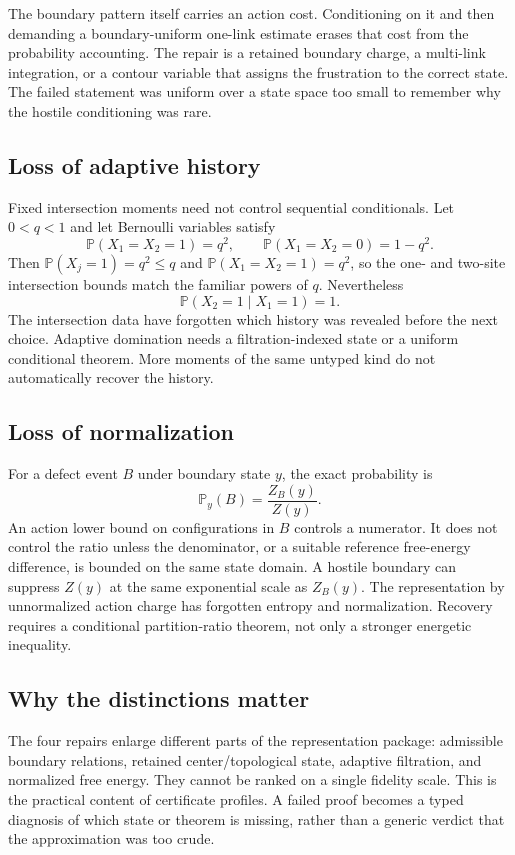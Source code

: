 The boundary pattern itself carries an action cost.  Conditioning on it and
then demanding a boundary-uniform one-link estimate erases that cost from the
probability accounting.  The repair is a retained boundary charge, a
multi-link integration, or a contour variable that assigns the frustration
to the correct state.  The failed statement was uniform over a state space
too small to remember why the hostile conditioning was rare.

\subsection{Loss of adaptive history}

Fixed intersection moments need not control sequential conditionals.  Let
$0<q<1$ and let Bernoulli variables satisfy
\[
 \mathbb P(X_1=X_2=1)=q^2,
 \qquad
 \mathbb P(X_1=X_2=0)=1-q^2.
\]
Then $\mathbb P(X_j=1)=q^2\leq q$ and
$\mathbb P(X_1=X_2=1)=q^2$, so the one- and two-site intersection bounds
match the familiar powers of $q$.  Nevertheless
\[
 \mathbb P(X_2=1\mid X_1=1)=1.
\]
The intersection data have forgotten which history was revealed before the
next choice.  Adaptive domination needs a filtration-indexed state or a
uniform conditional theorem.  More moments of the same untyped kind do not
automatically recover the history.

\subsection{Loss of normalization}

For a defect event $B$ under boundary state $y$, the exact probability is
\begin{equation}
\label{eq:partition-ratio}
 \mathbb P_y(B)=\frac{Z_B(y)}{Z(y)}.
\end{equation}
An action lower bound on configurations in $B$ controls a numerator.  It does
not control the ratio unless the denominator, or a suitable reference
free-energy difference, is bounded on the same state domain.  A hostile
boundary can suppress $Z(y)$ at the same exponential scale as $Z_B(y)$.
The representation by unnormalized action charge has forgotten entropy and
normalization.  Recovery requires a conditional partition-ratio theorem, not
only a stronger energetic inequality.

\subsection{Why the distinctions matter}

The four repairs enlarge different parts of the representation package:
admissible boundary relations, retained center/topological state, adaptive
filtration, and normalized free energy.  They cannot be ranked on a single
fidelity scale.  This is the practical content of certificate profiles.  A
failed proof becomes a typed diagnosis of which state or theorem is missing,
rather than a generic verdict that the approximation was too crude.
